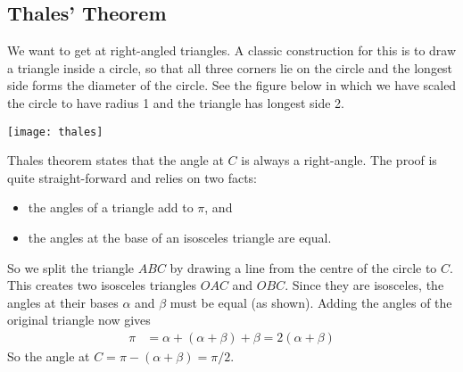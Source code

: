 \subsection{Thales' Theorem}\label{ssec_B_1_1}
We want to get at right-angled triangles. A classic construction for this is to
draw a triangle inside a circle, so that all three corners lie on the circle
and the longest side forms the diameter of the circle. See the figure below in
which we have scaled the circle to have radius 1 and the triangle has longest
side 2.

\begin{center}
  \texttt{[image: thales]}
\end{center}

Thales theorem states that the angle at $C$ is always a right-angle. The proof
is quite straight-forward and relies on two facts:
\begin{itemize}
 \item the angles of a triangle add to $\pi$, and
 \item the angles at the base of an isosceles triangle are equal.
\end{itemize}
So we split the triangle $ABC$ by drawing a line from the centre of the circle to $C$. This creates two isosceles triangles $OAC$ and $OBC$. Since they are isosceles, the angles at their bases $\alpha$ and $\beta$ must be equal (as shown).  Adding the angles of the original triangle now gives
\begin{align*}
  \pi &= \alpha + (\alpha+\beta) + \beta = 2(\alpha+\beta)
\end{align*}
So the angle at $C = \pi - (\alpha+\beta) = \pi/2$.


